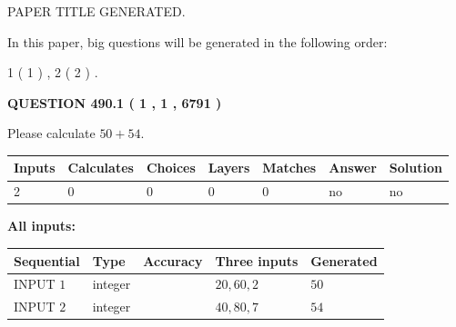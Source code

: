 \documentclass[12pt]{article}
\begin{document}
   
\vspace{0.2in}
   
   
   
   
   
   
   
   
 \vspace{0.2in}
 
 
 
 
   
   
 PAPER TITLE GENERATED.
   
   
   
\vspace{0.2in}
   
In this paper, big questions will be generated in the following order: 
   
   
   1 ( 1 )
 ,
   2 ( 2 )
 .
  
\vspace{0.2in}
  
{\textbf{\Large{QUESTION
490.1 
 ( 1 , 1 , 6791 )
}}}
  
  
 
Please calculate $ %
50 +  %
54 $.
 
 
   
   
   
   
\noindent\begin{tabular}{|l|l|l|l|l|l|l|}
 \hline
Inputs & Calculates & Choices & Layers & Matches & Answer & Solution \\ \hline
 2  & 
 0  & 
 0
  & 
 0  & 
 0  & 
  no & 
  no 
  \\ \hline
 \end{tabular}
   
   
   
   
\noindent{}
   
   
   
   
\noindent\vspace{0.1in}\hspace{-0.08in} {\textbf{\Large{All inputs: }}}
   
   
  
  
\noindent\begin{tabular}{|l|l|l|l|l|}
\hline
 Sequential & Type & Accuracy & Three inputs & Generated \\ 
\hline
 
 
  INPUT $  1 $ & integer &  & $
 20
 , 
 60
 , 
 2
 $ & $ 50 $ 
 \\  \hline  
 
 
  INPUT $  2 $ & integer &  & $
 40
 , 
 80
 , 
 7
 $ & $ 54 $ 
 \\  \hline  
 \end{tabular}
   
\end{document}
